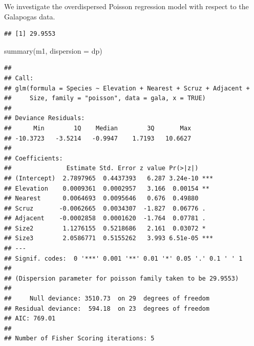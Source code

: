 \documentclass[
  ignorenonframetext,
]{beamer}
\newenvironment{Shaded}{\begin{snugshade}}{\end{snugshade}}
\newcommand{\AttributeTok}[1]{\textcolor[rgb]{0.77,0.63,0.00}{#1}}
\newcommand{\DecValTok}[1]{\textcolor[rgb]{0.00,0.00,0.81}{#1}}
\newcommand{\DocumentationTok}[1]{\textcolor[rgb]{0.56,0.35,0.01}{\textbf{\textit{#1}}}}
\newcommand{\FunctionTok}[1]{\textcolor[rgb]{0.00,0.00,0.00}{#1}}
\newcommand{\NormalTok}[1]{#1}
\newcommand{\OtherTok}[1]{\textcolor[rgb]{0.56,0.35,0.01}{#1}}
\newcommand{\SpecialCharTok}[1]{\textcolor[rgb]{0.00,0.00,0.00}{#1}}
\newcommand{\StringTok}[1]{\textcolor[rgb]{0.31,0.60,0.02}{#1}}
\begin{document}
\begin{frame}[fragile]{}
\protect\hypertarget{section-3}{}
We investigate the overdispersed Poisson regression model with respect
to the Galapogas data.

\vspace{12pt}

\begin{Shaded}
\end{Shaded}

\begin{verbatim}
## [1] 29.9553
\end{verbatim}
\end{frame}

\begin{frame}[fragile]{}
\protect\hypertarget{section-4}{}
\tiny

\begin{Shaded}
\begin{Highlighting}[]
\FunctionTok{summary}\NormalTok{(m1, }\AttributeTok{dispersion =}\NormalTok{ dp)}
\end{Highlighting}
\end{Shaded}

\begin{verbatim}
## 
## Call:
## glm(formula = Species ~ Elevation + Nearest + Scruz + Adjacent + 
##     Size, family = "poisson", data = gala, x = TRUE)
## 
## Deviance Residuals: 
##      Min        1Q    Median        3Q       Max  
## -10.3723   -3.5214   -0.9947    1.7193   10.6627  
## 
## Coefficients:
##               Estimate Std. Error z value Pr(>|z|)    
## (Intercept)  2.7897965  0.4437393   6.287 3.24e-10 ***
## Elevation    0.0009361  0.0002957   3.166  0.00154 ** 
## Nearest      0.0064693  0.0095646   0.676  0.49880    
## Scruz       -0.0062665  0.0034307  -1.827  0.06776 .  
## Adjacent    -0.0002858  0.0001620  -1.764  0.07781 .  
## Size2        1.1276155  0.5218686   2.161  0.03072 *  
## Size3        2.0586771  0.5155262   3.993 6.51e-05 ***
## ---
## Signif. codes:  0 '***' 0.001 '**' 0.01 '*' 0.05 '.' 0.1 ' ' 1
## 
## (Dispersion parameter for poisson family taken to be 29.9553)
## 
##     Null deviance: 3510.73  on 29  degrees of freedom
## Residual deviance:  594.18  on 23  degrees of freedom
## AIC: 769.01
## 
## Number of Fisher Scoring iterations: 5
\end{verbatim}
\end{frame}
\end{document}
